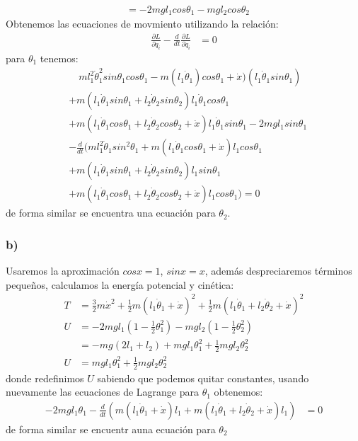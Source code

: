\documentclass{article}
\begin{document}
\begin{tcolorbox}[breakable]
\begin{align*}
        &= -2mgl_1cos\theta_1 - mgl_2cos\theta_2
    \end{align*}
    Obtenemos las ecuaciones de movmiento utilizando la relación:
    \begin{align*}
        \frac{\partial L}{\partial q_i} - \frac{d}{dt}\frac{\partial L }{\partial \dot{q}_i} &= 0 
    \end{align*}
    para $\theta_1$ tenemos:
    \begin{align*}
        &\quad ml_1^2\dot{\theta}_1^2sin\theta_1 cos\theta_1 
        - m(l_1\dot{\theta}_1)cos\theta_1 + \dot{x})(l_1\dot{\theta}_1sin\theta_1) \\
        &+m(l_1\dot{\theta}_1 sin\theta_1 + l_2\dot{\theta}_2 sin\theta_2)l_1\dot{\theta}_1cos\theta_1 \\
        &+m(l_1\dot{\theta}_1cos\theta_1 + l_2\dot{\theta}_2 cos\theta_2 + \dot{x})l_1\dot{\theta}_1sin\theta_1 - 2mgl_1sin\theta_1 \\
        &-\frac{d}{dt}\big(
        ml_1^2\dot{\theta}_1sin^2 \theta_1 + m(l_1\dot{\theta}_1cos\theta_1 + \dot{x})l_1cos\theta_1 \\
        &+m(l_1\dot{\theta}_1 sin\theta_1 + l_2\dot{\theta}_2 sin\theta_2)l_1sin\theta_1 \\
        &+m(l_1\dot{\theta}_1cos\theta_1 + l_2\dot{\theta}_2 cos\theta_2 + \dot{x})l_1cos\theta_1 \big)
        = 0
    \end{align*}
    de forma similar se encuentra una ecuación para $\theta_2$.
    \subsubsection*{b)}
    Usaremos la aproximación $cosx = 1$, $sinx=x$, además despreciaremos términos pequeños,
    calculamos la energía potencial y cinética:
    \begin{align*}
        T
        &= \frac{3}{2}m\dot{x}^2 + \frac{1}{2}m(l_1\dot{\theta}_1 + \dot{x})^2 + \frac{1}{2}m(l_1\dot{\theta}_1+l_2\dot{\theta}_2 + \dot{x})^2 \\
        U
        &= -2mgl_1(1-\tfrac{1}{2}\theta_1^2) - mgl_2(1-\tfrac{1}{2}\theta_2^2) \\
        &= -mg(2l_1+l_2) + mgl_1\theta_1^2 + \frac{1}{2}mgl_2\theta_2^2 \\
        U
        &= mgl_1\theta_1^2 + \frac{1}{2}mgl_2\theta_2^2
    \end{align*}
    donde redefinimos $U$ sabiendo que podemos quitar constantes, usando nuevamente las ecuaciones de Lagrange para $\theta_1$ obtenemos:
    \begin{align*}
        -2mgl_1\theta_1 - \frac{d}{dt} \left(m(l_1\dot{\theta}_1+\dot{x})l_1 + m(l_1\dot{\theta}_1 + l_2\dot{\theta}_2 + \dot{x})l_1 \right) &= 0
    \end{align*}
    de forma similar se encuentr auna ecuación para $\theta_2$

\end{tcolorbox}
\end{document}
